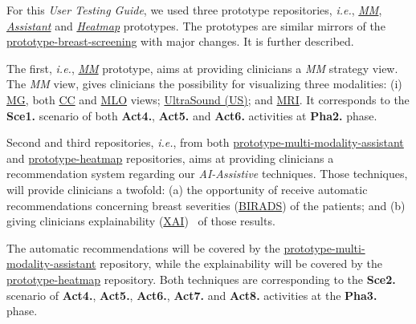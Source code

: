 For this {\it User Testing Guide}, we used three prototype repositories, \textit{i.e.}, \hyperlink{https://github.com/MIMBCD-UI/prototype-multi-modality}{{\it \gls{MM}}}, \textit{\hyperlink{https://github.com/mida-project/prototype-multi-modality-assistant}{Assistant}} and \textit{\hyperlink{https://github.com/mida-project/prototype-heatmap}{Heatmap}} prototypes. The prototypes are similar mirrors of the \hyperlink{https://github.com/MIMBCD-UI/prototype-breast-screening}{prototype-breast-screening} with major changes. It is further described.

The first, \textit{i.e.}, \hyperlink{https://github.com/MIMBCD-UI/prototype-multi-modality}{{\it \gls{MM}}} prototype, aims at providing clinicians a {\it \gls{MM}} strategy view. The {\it \gls{MM}} view, gives clinicians the possibility for visualizing three modalities: (i) \hyperlink{https://medical-dictionary.thefreedictionary.com/mammography}{\gls{MG}}, both \hyperlink{https://medical-dictionary.thefreedictionary.com/craniocaudal}{\gls{CC}} and \hyperlink{https://www.thefreedictionary.com/mediolateral}{\gls{MLO}} views; \hyperlink{https://www.thefreedictionary.com/UltraSound}{UltraSound (US)}; and \hyperlink{https://www.thefreedictionary.com/Magnetic+Resonance+Imaging}{\gls{MRI}}. It corresponds to the \textbf{Sce1.} scenario of both \textbf{Act4.}, \textbf{Act5.} and \textbf{Act6.} activities at \textbf{Pha2.} phase.

Second and third repositories, \textit{i.e.}, from both \hyperlink{https://github.com/mida-project/prototype-multi-modality-assistant}{prototype-multi-modality-assistant} and \hyperlink{https://github.com/mida-project/prototype-heatmap}{prototype-heatmap} repositories, aims at providing clinicians a recommendation system regarding our \textit{AI-Assistive} techniques. Those techniques, will provide clinicians a twofold: (a) the opportunity of receive automatic recommendations concerning breast severities (\hyperlink{https://en.wikipedia.org/wiki/BI-RADS}{BIRADS}) of the patients; and (b) giving clinicians explainability (\hyperlink{https://www.darpa.mil/program/explainable-artificial-intelligence}{XAI})~\cite{gunning2017explainable, holzinger2017we} of those results.

The automatic recommendations will be covered by the \hyperlink{https://github.com/mida-project/prototype-multi-modality-assistant}{prototype-multi-modality-assistant} repository, while the explainability will be covered by the \hyperlink{https://github.com/mida-project/prototype-heatmap}{prototype-heatmap} repository. Both techniques are corresponding to the \textbf{Sce2.} scenario of \textbf{Act4.}, \textbf{Act5.}, \textbf{Act6.}, \textbf{Act7.} and \textbf{Act8.} activities at the \textbf{Pha3.} phase.